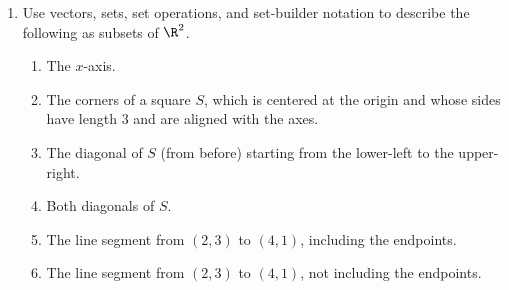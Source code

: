 




		\begin{enumerate}
			\item Use vectors, sets, set operations, and set-builder notation
				to describe the following as subsets of $\R^2$.
				\begin{enumerate}
					\item The $x$-axis.
					\item The corners of a square $S$, which is centered at the origin and whose
						sides have length 3 and are aligned with the axes.
					\item The diagonal of $S$ (from before) starting from the lower-left to the upper-right.
					\item Both diagonals of $S$.
					\item The line segment from $(2,3)$ to $(4,1)$, including the endpoints.
					\item The line segment from $(2,3)$ to $(4,1)$, not including the endpoints.
				\end{enumerate}


\end{enumerate}
